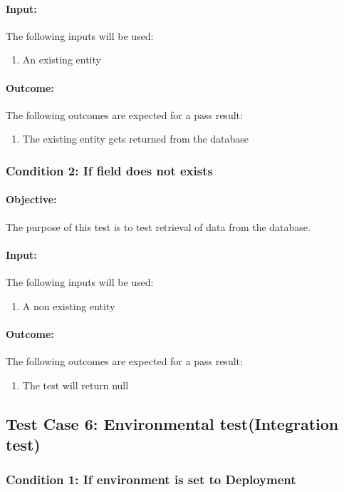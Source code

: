 \documentclass{article}
\begin{document}
\paragraph{Input:} The following inputs will be used:
\begin{enumerate}
	\item An existing entity
\end{enumerate}
\paragraph{Outcome:} The following outcomes are expected for a pass result:
\begin{enumerate}
	\item The existing entity gets returned from the database
\end{enumerate}
\subsubsection{Condition 2: If field does not exists }
\paragraph{Objective:} The purpose of this test is to test retrieval of data from the database.
\paragraph{Input:} The following inputs will be used:
\begin{enumerate}
	\item A non existing entity 
\end{enumerate}
\paragraph{Outcome:} The following outcomes are expected for a pass result:
\begin{enumerate}
	\item The test will return null
\end{enumerate}


\subsection{Test Case 6: Environmental test(Integration test)}\label{test6}
\subsubsection{Condition 1: If environment is set to Deployment }
\end{document}
